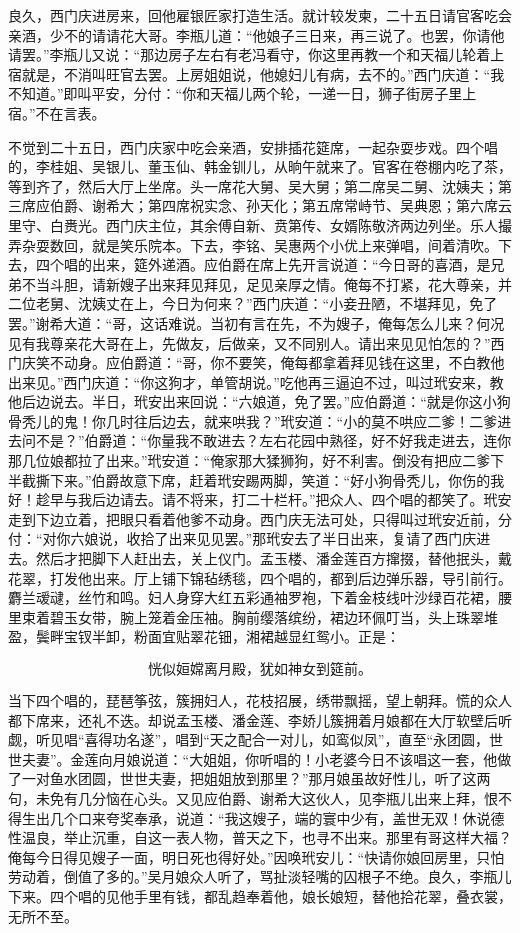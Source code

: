 良久，西门庆进房来，回他雇银匠家打造生活。就计较发柬，二十五日请官客吃会亲酒，少不的请请花大哥。李瓶儿道：“他娘子三日来，再三说了。也罢，你请他请罢。”李瓶儿又说：“那边房子左右有老冯看守，你这里再教一个和天福儿轮着上宿就是，不消叫旺官去罢。上房姐姐说，他媳妇儿有病，去不的。”西门庆道：“我不知道。”即叫平安，分付：“你和天福儿两个轮，一递一日，狮子街房子里上宿。”不在言表。

不觉到二十五日，西门庆家中吃会亲酒，安排插花筵席，一起杂耍步戏。四个唱的，李桂姐、吴银儿、董玉仙、韩金钏儿，从晌午就来了。官客在卷棚内吃了茶，等到齐了，然后大厅上坐席。头一席花大舅、吴大舅；第二席吴二舅、沈姨夫；第三席应伯爵、谢希大；第四席祝实念、孙天化；第五席常峙节、吴典恩；第六席云里守、白赉光。西门庆主位，其余傅自新、贲第传、女婿陈敬济两边列坐。乐人撮弄杂耍数回，就是笑乐院本。下去，李铭、吴惠两个小优上来弹唱，间着清吹。下去，四个唱的出来，筵外递酒。应伯爵在席上先开言说道：“今日哥的喜酒，是兄弟不当斗胆，请新嫂子出来拜见拜见，足见亲厚之情。俺每不打紧，花大尊亲，并二位老舅、沈姨丈在上，今日为何来？”西门庆道：“小妾丑陋，不堪拜见，免了罢。”谢希大道：“哥，这话难说。当初有言在先，不为嫂子，俺每怎么儿来？何况见有我尊亲花大哥在上，先做友，后做亲，又不同别人。请出来见见怕怎的？”西门庆笑不动身。应伯爵道：“哥，你不要笑，俺每都拿着拜见钱在这里，不白教他出来见。”西门庆道：“你这狗才，单管胡说。”吃他再三逼迫不过，叫过玳安来，教他后边说去。半日，玳安出来回说：“六娘道，免了罢。”应伯爵道：“就是你这小狗骨秃儿的鬼！你几时往后边去，就来哄我？”玳安道：“小的莫不哄应二爹！二爹进去问不是？”伯爵道：“你量我不敢进去？左右花园中熟径，好不好我走进去，连你那几位娘都拉了出来。”玳安道：“俺家那大猱狮狗，好不利害。倒没有把应二爹下半截撕下来。”伯爵故意下席，赶着玳安踢两脚，笑道：“好小狗骨秃儿，你伤的我好！趁早与我后边请去。请不将来，打二十栏杆。”把众人、四个唱的都笑了。玳安走到下边立着，把眼只看着他爹不动身。西门庆无法可处，只得叫过玳安近前，分付：“对你六娘说，收拾了出来见见罢。”那玳安去了半日出来，复请了西门庆进去。然后才把脚下人赶出去，关上仪门。孟玉楼、潘金莲百方撺掇，替他抿头，戴花翠，打发他出来。厅上铺下锦毡绣毯，四个唱的，都到后边弹乐器，导引前行。麝兰叆叇，丝竹和鸣。妇人身穿大红五彩通袖罗袍，下着金枝线叶沙绿百花裙，腰里束着碧玉女带，腕上笼着金压袖。胸前缨落缤纷，裙边环佩叮当，头上珠翠堆盈，鬓畔宝钗半卸，粉面宜贴翠花钿，湘裙越显红鸳小。正是：

\[
恍似姮嫦离月殿，犹如神女到筵前。
\]

当下四个唱的，琵琶筝弦，簇拥妇人，花枝招展，绣带飘摇，望上朝拜。慌的众人都下席来，还礼不迭。却说孟玉楼、潘金莲、李娇儿簇拥着月娘都在大厅软壁后听觑，听见唱“喜得功名遂”，唱到“天之配合一对儿，如鸾似凤”，直至“永团圆，世世夫妻”。金莲向月娘说道：“大姐姐，你听唱的！小老婆今日不该唱这一套，他做了一对鱼水团圆，世世夫妻，把姐姐放到那里？”那月娘虽故好性儿，听了这两句，未免有几分恼在心头。又见应伯爵、谢希大这伙人，见李瓶儿出来上拜，恨不得生出几个口来夸奖奉承，说道：“我这嫂子，端的寰中少有，盖世无双！休说德性温良，举止沉重，自这一表人物，普天之下，也寻不出来。那里有哥这样大福？俺每今日得见嫂子一面，明日死也得好处。”因唤玳安儿：“快请你娘回房里，只怕劳动着，倒值了多的。”吴月娘众人听了，骂扯淡轻嘴的囚根子不绝。良久，李瓶儿下来。四个唱的见他手里有钱，都乱趋奉着他，娘长娘短，替他拾花翠，叠衣裳，无所不至。

